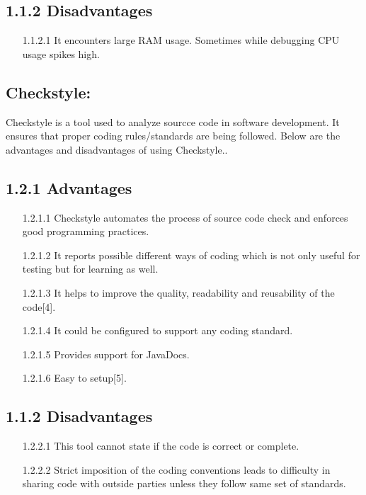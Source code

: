 \documentclass[10pt]{article}
\begin{document}
\subsection*{\large 1.1.2 Disadvantages}
\begin{description}
\begin{itemize}
\item [1.1.2.1]It encounters large RAM usage. Sometimes while debugging CPU usage spikes high. 
\end{itemize}
\end{description}
\newpage
\subsection{Checkstyle:}
Checkstyle is a tool used to analyze sourcce code in software development. It ensures that proper coding rules/standards are being followed.
Below are the advantages and disadvantages of using Checkstyle..\\
\subsection*{\large 1.2.1 Advantages}
\begin{description}
\begin{itemize}
\item [1.2.1.1] Checkstyle automates the process of source code check and enforces good programming practices.
\item [1.2.1.2]It reports possible different ways of coding which is not only useful for testing but for learning as well.
\item [1.2.1.3]It helps to improve the quality, readability and reusability of the code[4].
\item [1.2.1.4]It could be configured to support any coding standard.
\item [1.2.1.5]Provides support for JavaDocs.
\item [1.2.1.6]Easy to setup[5].
\end{itemize}
\end{description}
\subsection*{\large 1.1.2 Disadvantages}
\begin{description}
\begin{itemize}
\item [1.2.2.1]This tool cannot state if the code is correct or complete.
\item [1.2.2.2]Strict imposition of the coding conventions leads to difficulty in sharing code with outside parties unless they follow same set of standards.
\end{itemize}
\end{description}
\newpage
\end{document}
